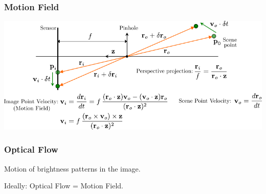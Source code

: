 \begin{frame}
  \frametitle{Motion Field}
  \begin{center}
    \includegraphics[width=\columnwidth]{./images/optical_flow/motion_field.pdf}
  \end{center}

  

\end{frame}


\begin{frame}
  \frametitle{Optical Flow}
Motion of brightness patterns in the image.

Ideally: Optical Flow = Motion Field.

\vspace{0.5cm}
\centering
\end{frame}

